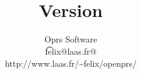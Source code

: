 \documentclass[twoside,openright]{book}
\begin{document}
\title{
        \COPRSDE{} \\
         Version \oprsdocversion{}}

\author{Oprs Software\\
        \t{felix@laas.fr@} \\
        {http://www.laas.fr/\~{}felix/openprs/}
}

\maketitle

\clearpage


\clearpage
\pagestyle{headings}

\tableofcontents
\listoffigures
\listoftables

\cleardoublepage
{}













\end{document}
